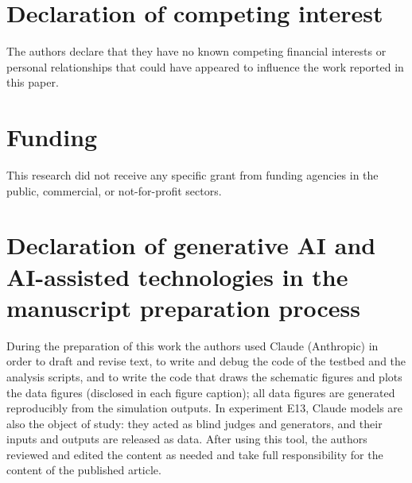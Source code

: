 \documentclass[preprint,12pt,authoryear]{elsarticle}
\theoremstyle{definition}
\begin{document}
\section*{Declaration of competing interest}
The authors declare that they have no known competing financial interests or personal relationships that could have appeared to influence the work reported in this paper.

\section*{Funding}
This research did not receive any specific grant from funding agencies in the public, commercial, or not-for-profit sectors.
\fi

\section*{Declaration of generative AI and AI-assisted technologies in the manuscript preparation process}
During the preparation of this work the authors used Claude (Anthropic) in order to draft and revise text, to write and debug the code of the testbed and the analysis scripts, and to write the code that draws the schematic figures and plots the data figures (disclosed in each figure caption); all data figures are generated reproducibly from the simulation outputs. In experiment E13, Claude models are also the object of study: they acted as blind judges and generators, and their inputs and outputs are released as data. After using this tool, the authors reviewed and edited the content as needed and take full responsibility for the content of the published article.


\end{document}
